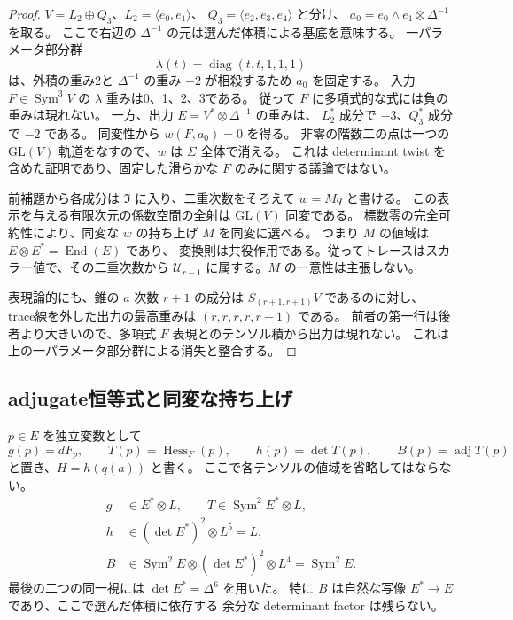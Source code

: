\begin{proof}
$V=L_2\oplus Q_3$、$L_2=\langle e_0,e_1\rangle$、
$Q_3=\langle e_2,e_3,e_4\rangle$ と分け、
$a_0=e_0\wedge e_1\otimes\Delta^{-1}$ を取る。
ここで右辺の $\Delta^{-1}$ の元は選んだ体積による基底を意味する。
一パラメータ部分群
\[
 \lambda(t)=\operatorname{diag}(t,t,1,1,1)
\]
は、外積の重み2と $\Delta^{-1}$ の重み $-2$ が相殺するため $a_0$ を固定する。
入力 $F\in\operatorname{Sym}^3V$ の $\lambda$ 重みは0、1、2、3である。
従って $F$ に多項式的な式には負の重みは現れない。
一方、出力 $E=V^*\otimes\Delta^{-1}$ の重みは、
$L_2^*$ 成分で $-3$、$Q_3^*$ 成分で $-2$ である。
同変性から $w(F,a_0)=0$ を得る。
非零の階数二の点は一つの $\mathrm{GL}(V)$ 軌道をなすので、$w$ は $\Sigma$ 全体で消える。
これは determinant twist を含めた証明であり、固定した滑らかな $F$ のみに関する議論ではない。

前補題から各成分は $\mathfrak I$ に入り、二重次数をそろえて $w=Mq$ と書ける。
この表示を与える有限次元の係数空間の全射は $\mathrm{GL}(V)$ 同変である。
標数零の完全可約性により、同変な $w$ の持ち上げ $M$ を同変に選べる。
つまり $M$ の値域は $E\otimes E^*=\operatorname{End}(E)$ であり、
変換則は共役作用である。従ってトレースはスカラー値で、その二重次数から
$\mathcal U_{r-1}$ に属する。$M$ の一意性は主張しない。

表現論的にも、錐の $a$ 次数 $r+1$ の成分は $S_{(r+1,r+1)}V$ であるのに対し、
trace線を外した出力の最高重みは $(r,r,r,r,r-1)$ である。
前者の第一行は後者より大きいので、多項式 $F$ 表現とのテンソル積から出力は現れない。
これは上の一パラメータ部分群による消失と整合する。
\end{proof}

\subsection{adjugate恒等式と同変な持ち上げ}

$p\in E$ を独立変数として
\[
 g(p)=dF_p,\qquad T(p)=\operatorname{Hess}_F(p),\qquad
 h(p)=\det T(p),\qquad B(p)=\operatorname{adj}T(p)
\]
と置き、$H=h(q(a))$ と書く。
ここで各テンソルの値域を省略してはならない。
\[
\begin{split}
 g&\in E^*\otimes L,\qquad
 T\in\operatorname{Sym}^2E^*\otimes L,\\
 h&\in(\det E^*)^2\otimes L^5=L,\\
 B&\in\operatorname{Sym}^2E\otimes(\det E^*)^2\otimes L^4
      =\operatorname{Sym}^2E.
\end{split}
\]
最後の二つの同一視には $\det E^*=\Delta^6$ を用いた。
特に $B$ は自然な写像 $E^*\to E$ であり、ここで選んだ体積に依存する
余分な determinant factor は残らない。

